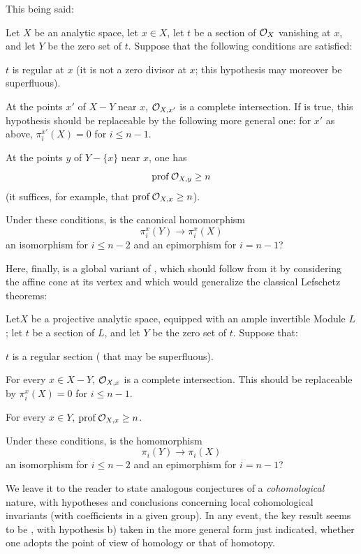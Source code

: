 This being said:

\begin{probleme} \label{XIII.4.2}
Let $X$ be an analytic space, let $x\in X$, let $t$ be a section of
$\mathcal O_X$ vanishing at $x$, and let $Y$ be the zero set of $t$. Suppose that
the following conditions are satisfied:
\begin{enumeratea}
\item
$t$ is regular at $x$ (\ie it is not a zero divisor at $x$; this
hypothesis may moreover be superfluous).
\item
At the points $x'$ of $X-Y$ near $x$, $\mathcal O_{X,x'}$ is a complete
intersection. If  is true, this hypothesis should be
replaceable by the following more general one: for $x'$ as above,
$\pi_i^{x'}(X)=0$ for $i\leq n-1$.
\item
At the points $y$ of $Y-\{x\}$ near $x$, one has
$$
\operatorname{prof}\mathcal O_{X,y}\geq n
$$
(it suffices, for example, that $\operatorname{prof}\mathcal O_{X,x}\geq n$).
\end{enumeratea}

Under these conditions, is the canonical homomorphism
$$
\pi_i^x(Y)\to\pi_i^x(X)
$$
an isomorphism for $i\leq n-2$ and an epimorphism for $i=n-1$?
\end{probleme}

Here, finally, is a global variant of , which should
follow from it by considering the affine cone at its vertex and
which would generalize the classical Lefschetz theorems:

\begin{probleme} \label{XIII.4.3}
Let\pageoriginale $X$ be a projective analytic space, equipped with an
ample invertible Module $L$; let $t$ be a section of $L$, and let $Y$ be
the zero set of $t$. Suppose that:
\begin{enumeratea}
\item
$t$ is a regular section ( that may
be superfluous).
\item
For every $x\in X-Y$, $\mathcal O_{X,x}$ is a complete intersection. This
should be replaceable by $\pi_i^x(X)=0$ for $i\leq n-1$.
\item
For every $x\in Y$, $\operatorname{prof}\mathcal O_{X,x}\geq n$.
\end{enumeratea}

Under these conditions, is the homomorphism
$$
\pi_i(Y)\to\pi_i(X)
$$
an isomorphism for $i\leq n-2$ and an epimorphism for $i=n-1$?
\end{probleme}

We leave it to the reader to state analogous conjectures of a
\emph{cohomological} nature, with hypotheses and
conclusions concerning local cohomological invariants (with coefficients
in a given group). In any event, the key result seems to be
, with hypothesis b) taken in the more general form just
indicated, whether one adopts the point of view of homology or that of
homotopy.

